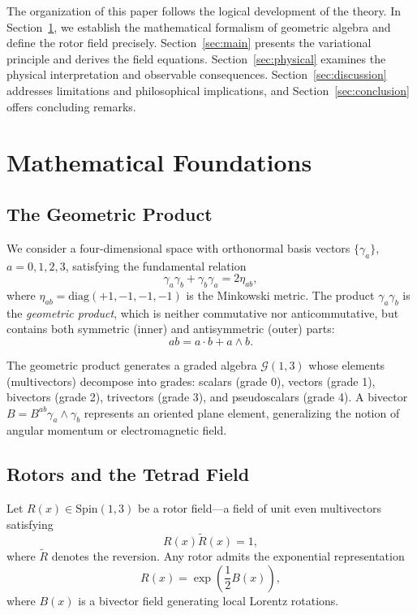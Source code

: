 \documentclass[11pt,a4paper]{article}
\numberwithin{equation}{section}
\theoremstyle{plain}
\theoremstyle{definition}
\theoremstyle{remark}
\begin{document}
The organization of this paper follows the logical development of the theory. In Section~\ref{sec:prelim}, we establish the mathematical formalism of geometric algebra and define the rotor field precisely. Section~\ref{sec:main} presents the variational principle and derives the field equations. Section~\ref{sec:physical} examines the physical interpretation and observable consequences. Section~\ref{sec:discussion} addresses limitations and philosophical implications, and Section~\ref{sec:conclusion} offers concluding remarks.

\section{Mathematical Foundations}
\label{sec:prelim}

\subsection{The Geometric Product}

We consider a four-dimensional space with orthonormal basis vectors $\{\gamma_a\}$, $a=0,1,2,3$, satisfying the fundamental relation
\begin{equation}
\gamma_a \gamma_b + \gamma_b \gamma_a = 2\eta_{ab},
\end{equation}
where $\eta_{ab}=\mathrm{diag}(+1,-1,-1,-1)$ is the Minkowski metric. The product $\gamma_a \gamma_b$ is the \emph{geometric product}, which is neither commutative nor anticommutative, but contains both symmetric (inner) and antisymmetric (outer) parts:
\begin{equation}
ab = a \cdot b + a \wedge b.
\end{equation}

The geometric product generates a graded algebra $\mathcal{G}(1,3)$ whose elements (multivectors) decompose into grades: scalars (grade 0), vectors (grade 1), bivectors (grade 2), trivectors (grade 3), and pseudoscalars (grade 4). A bivector $B = B^{ab}\gamma_a \wedge \gamma_b$ represents an oriented plane element, generalizing the notion of angular momentum or electromagnetic field.

\subsection{Rotors and the Tetrad Field}

Let $R(x) \in \mathrm{Spin}(1,3)$ be a rotor field---a field of unit even multivectors satisfying
\begin{equation}
R(x)\widetilde{R}(x) = 1,
\end{equation}
where $\widetilde{R}$ denotes the reversion. Any rotor admits the exponential representation
\begin{equation}
R(x) = \exp\left(\frac{1}{2}B(x)\right),
\end{equation}
where $B(x)$ is a bivector field generating local Lorentz rotations.
\end{document}
